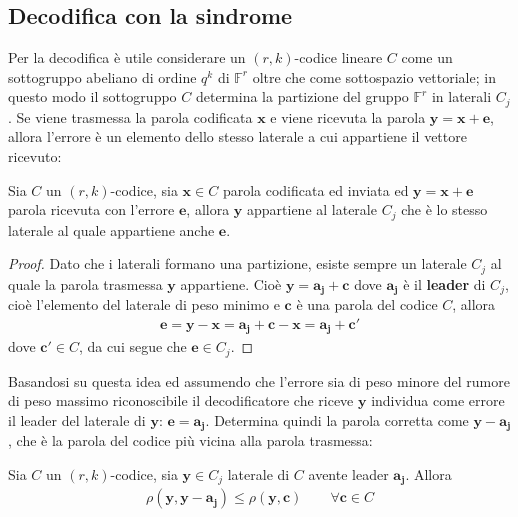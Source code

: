 \subsection{Decodifica con la sindrome}

Per la decodifica è utile considerare un $(r,k)$-codice lineare $C$ come un sottogruppo abeliano di ordine $q^k$ di $\mathbb{F}^{r}$ oltre che come sottospazio vettoriale; in questo modo il sottogruppo $C$ determina la partizione del gruppo $\mathbb{F}^{r}$ in laterali $C_{j}$. Se viene trasmessa la parola codificata $\mathbf{x}$ e viene ricevuta la parola $\mathbf{y} = \mathbf{x} + \mathbf{e}$, allora l'errore è un elemento dello stesso laterale a cui appartiene il vettore ricevuto:

\begin{teorema}
   Sia $C$ un $(r,k)$-codice, sia $\mathbf{x} \in C$ parola codificata ed inviata ed $\mathbf{y} = \mathbf{x} + \mathbf{e}$ parola ricevuta con l'errore $\mathbf{e}$, allora $\mathbf{y}$ appartiene al laterale $C_{j}$ che è lo stesso laterale al quale appartiene anche $\mathbf{e}$.
\end{teorema}
\begin{proof}
   Dato che i laterali formano una partizione, esiste sempre un laterale $C_{j}$ al quale la parola trasmessa $\mathbf{y}$ appartiene. Cioè $\mathbf{y} = \mathbf{a_{j}} + \mathbf{c}$ dove $\mathbf{a_{j}}$ è il {\bf leader} di $C_{j}$, cioè l'elemento del laterale di peso minimo e $\mathbf{c}$ è una parola del codice $C$, allora
   \begin{align*}
      \mathbf{e} = \mathbf{y} - \mathbf{x} = \mathbf{a_{j}} + \mathbf{c} - \mathbf{x} = \mathbf{a_{j}} + \mathbf{c'}
   \end{align*}
   dove $\mathbf{c'} \in C$, da cui segue che $\mathbf{e} \in C_{j}$.
\end{proof}
\noindent
Basandosi su questa idea ed assumendo che l'errore sia di peso minore del rumore di peso massimo riconoscibile il decodificatore che riceve $\mathbf{y}$ individua come errore il leader del laterale di $\mathbf{y}$: $\mathbf{e} = \mathbf{a_{j}}$. Determina quindi la parola corretta come $\mathbf{y} - \mathbf{a_{j}}$, che è la parola del codice più vicina alla parola trasmessa:
\begin{teorema}
   Sia $C$ un $(r,k)$-codice, sia $\mathbf{y} \in C_{j}$ laterale di $C$ avente leader $\mathbf{a_{j}}$. Allora
   \begin{align*}
      \rho (\mathbf{y} ,\mathbf{y} -\mathbf{a_{j}} ) \leq \rho (\mathbf{y} ,\mathbf{c}) \qquad \forall \mathbf{c} \in C
   \end{align*}
\end{teorema}

